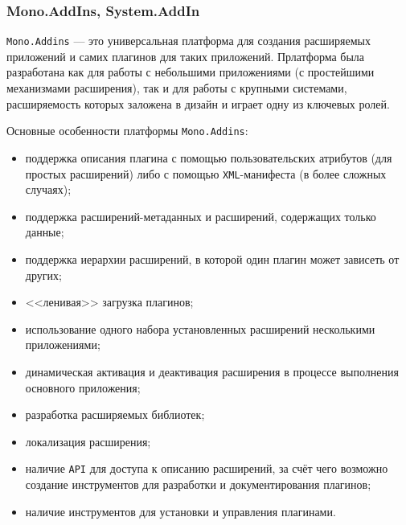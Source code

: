 \subsubsection{Mono.AddIns, System.AddIn}


{\tt Mono.Addins} --- это универсальная платформа для создания расширяемых приложений и самих плагинов для таких приложений. Прлатформа была разработана  как для работы с небольшими приложениями (с простейшими механизмами расширения), так и для работы с крупными системами, расширяемость которых заложена в дизайн и играет одну из ключевых ролей.

Основные особенности платформы {\tt Mono.Addins}:
\begin{itemize}
  \item поддержка описания плагина с помощью пользовательских атрибутов (для простых расширений) либо с помощью {\tt XML}-манифеста (в более сложных случаях);
  \item поддержка расширений-метаданных и расширений, содержащих только данные;
  \item поддержка иерархии расширений, в которой один плагин может зависеть от других;
  \item <<ленивая>> загрузка плагинов;
  \item использование одного набора установленных расширений несколькими приложениями;
  \item динамическая активация и деактивация расширения в процессе выполнения основного приложения;
  \item разработка расширяемых библиотек;
  \item локализация расширения;
  \item наличие {\tt API} для доступа к описанию расширений, за счёт чего возможно создание инструментов для разработки и документирования плагинов;
  \item наличие инструментов для установки и управления плагинами.
\end{itemize}
